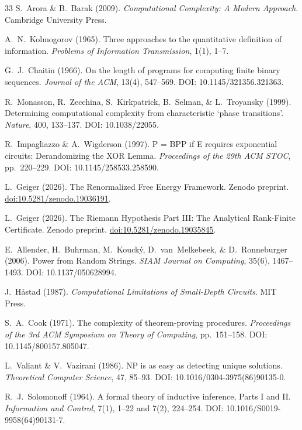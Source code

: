 \documentclass[aps,prd,twocolumn,superscriptaddress,nofootinbib]{revtex4-2}
\theoremstyle{definition}
\theoremstyle{remark}
\begin{document}
\begin{thebibliography}{33}
S.~Arora \& B.~Barak (2009).
\textit{Computational Complexity: A Modern Approach}.
Cambridge University Press.

A.~N.~Kolmogorov (1965).
Three approaches to the quantitative definition of information.
\textit{Problems of Information Transmission}, 1(1), 1--7.

G.~J.~Chaitin (1966).
On the length of programs for computing finite binary sequences.
\textit{Journal of the ACM}, 13(4), 547--569.
DOI: 10.1145/321356.321363.

R.~Monasson, R.~Zecchina, S.~Kirkpatrick, B.~Selman, \& L.~Troyansky (1999).
Determining computational complexity from characteristic `phase transitions'.
\textit{Nature}, 400, 133--137.
DOI: 10.1038/22055.

R.~Impagliazzo \& A.~Wigderson (1997).
P = BPP if E requires exponential circuits: Derandomizing the XOR Lemma.
\textit{Proceedings of the 29th ACM STOC}, pp.\ 220--229.
DOI: 10.1145/258533.258590.

L.~Geiger (2026).
The Renormalized Free Energy Framework.
Zenodo preprint.
\href{https://doi.org/10.5281/zenodo.19036191}{doi:10.5281/zenodo.19036191}.

L.~Geiger (2026).
The Riemann Hypothesis Part III: The Analytical Rank-Finite Certificate.
Zenodo preprint.
\href{https://doi.org/10.5281/zenodo.19035845}{doi:10.5281/zenodo.19035845}.

E.~Allender, H.~Buhrman, M.~Kouck\'y, D.~van~Melkebeek, \& D.~Ronneburger (2006).
Power from Random Strings.
\textit{SIAM Journal on Computing}, 35(6), 1467--1493.
DOI: 10.1137/050628994.

J.~H\r{a}stad (1987).
\textit{Computational Limitations of Small-Depth Circuits}.
MIT Press.

S.~A.~Cook (1971).
The complexity of theorem-proving procedures.
\textit{Proceedings of the 3rd ACM Symposium on Theory of Computing}, pp.\ 151--158.
DOI: 10.1145/800157.805047.

L.~Valiant \& V.~Vazirani (1986).
NP is as easy as detecting unique solutions.
\textit{Theoretical Computer Science}, 47, 85--93.
DOI: 10.1016/0304-3975(86)90135-0.

R.~J.~Solomonoff (1964).
A formal theory of inductive inference, Parts I and II.
\textit{Information and Control}, 7(1), 1--22 and 7(2), 224--254.
DOI: 10.1016/S0019-9958(64)90131-7.


\end{thebibliography}
\end{document}
